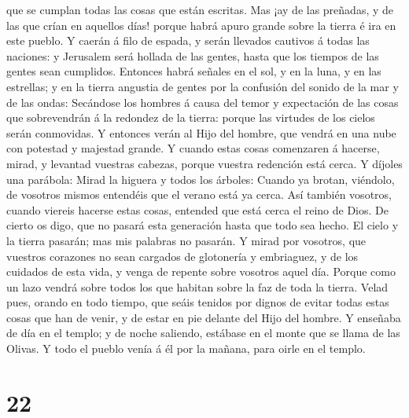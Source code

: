 que se cumplan todas las cosas que están escritas.  Mas ¡ay
de las preñadas, y de las que crían en aquellos días! porque habrá apuro
grande sobre la tierra é ira en este pueblo.  Y caerán á
filo de espada, y serán llevados cautivos á todas las naciones: y
Jerusalem será hollada de las gentes, hasta que los tiempos de las
gentes sean cumplidos.  Entonces habrá señales en el sol, y
en la luna, y en las estrellas; y en la tierra angustia de gentes por la
confusión del sonido de la mar y de las ondas:  Secándose
los hombres á causa del temor y expectación de las cosas que
sobrevendrán á la redondez de la tierra: porque las virtudes de los
cielos serán conmovidas.  Y entonces verán al Hijo del
hombre, que vendrá en una nube con potestad y majestad grande.
 Y cuando estas cosas comenzaren á hacerse, mirad, y
levantad vuestras cabezas, porque vuestra redención está cerca.
 Y díjoles una parábola: Mirad la higuera y todos los
árboles:  Cuando ya brotan, viéndolo, de vosotros mismos
entendéis que el verano está ya cerca.  Así también
vosotros, cuando viereis hacerse estas cosas, entended que está cerca el
reino de Dios.  De cierto os digo, que no pasará esta
generación hasta que todo sea hecho.  El cielo y la tierra
pasarán; mas mis palabras no pasarán.  Y mirad por
vosotros, que vuestros corazones no sean cargados de glotonería y
embriaguez, y de los cuidados de esta vida, y venga de repente sobre
vosotros aquel día.  Porque como un lazo vendrá sobre todos
los que habitan sobre la faz de toda la tierra.  Velad
pues, orando en todo tiempo, que seáis tenidos por dignos de evitar
todas estas cosas que han de venir, y de estar en pie delante del Hijo
del hombre.  Y enseñaba de día en el templo; y de noche
saliendo, estábase en el monte que se llama de las Olivas. 
Y todo el pueblo venía á él por la mañana, para oirle en el templo.

\hypertarget{section-21}{%
\section{22}\label{section-21}}

